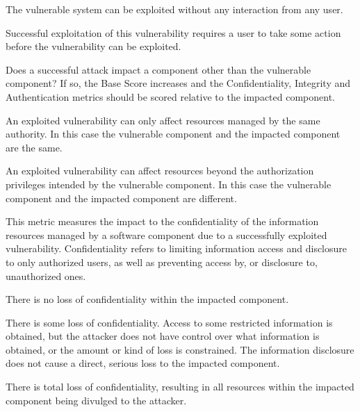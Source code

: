 \begin{description}[itemsep=1em,align=left]
            \begin{description}[noitemsep,align=left]
                \item [None:] The vulnerable system can be exploited without any interaction from any user.
                \item [Required:] Successful exploitation of this vulnerability requires a user to take some action before the vulnerability can be exploited.
            \end{description}
        \item [Scope:] Does a successful attack impact a component other than the vulnerable component? 
            If so, the Base Score increases and the Confidentiality, Integrity and Authentication metrics should be scored relative to the impacted component.
            \begin{description}[noitemsep,align=left]
                \item [Unchanged:] An exploited vulnerability can only affect resources managed by the same authority. 
                    In this case the vulnerable component and the impacted component are the same.
                \item [Changed:] An exploited vulnerability can affect resources beyond the authorization privileges intended by the vulnerable component. 
                    In this case the vulnerable component and the impacted component are different.
            \end{description}
        \item [Confidentiality:] This metric measures the impact to the confidentiality of the information resources managed by a software component due to a successfully exploited vulnerability.
            Confidentiality refers to limiting information access and disclosure to only authorized users, as well as preventing access by, or disclosure to, unauthorized ones.
            \begin{description}[noitemsep,align=left]
                \item [None:] There is no loss of confidentiality within the impacted component.
                \item [Low:] There is some loss of confidentiality. 
                    Access to some restricted information is obtained, but the attacker does not have control over what information is obtained, or the amount or kind of loss is constrained. 
                    The information disclosure does not cause a direct, serious loss to the impacted component.
                \item [High:] There is total loss of confidentiality, resulting in all resources within the impacted component being divulged to the attacker. 

\end{description}
\end{description}
